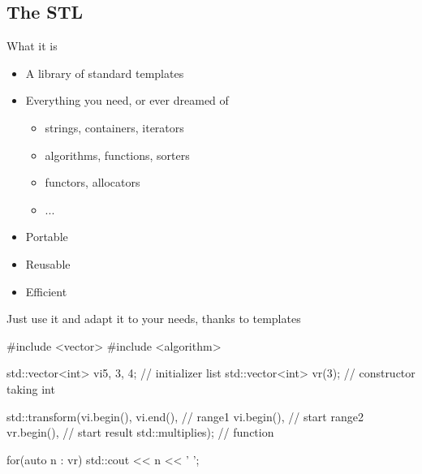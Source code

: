 \subsection[STL]{The STL}

\begin{frame}[fragile]
  \begin{block}{What it is}
    \begin{itemize}
    \item A library of standard templates
    \item Everything you need, or ever dreamed of
      \begin{itemize}
      \item strings, containers, iterators
      \item algorithms, functions, sorters
      \item functors, allocators
      \item ...
      \end{itemize}
    \item Portable
    \item Reusable
    \item Efficient
    \end{itemize}
  \end{block}
  \pause
  \begin{alertblock}{Just use it}
    and adapt it to your needs, thanks to templates
  \end{alertblock}
\end{frame}

\begin{frame}[fragile,label=STLcode]
  \begin{cppcode*}{}
    #include <vector>
    #include <algorithm>

    std::vector<int> vi{5, 3, 4}; // initializer list
    std::vector<int> vr(3); // constructor taking int

    std::transform(vi.begin(), vi.end(),      // range1
                   vi.begin(),          // start range2
                   vr.begin(),          // start result
                   std::multiplies{}); // function

    for(auto n : vr) {
      std::cout << n << ' ';
    }
  \end{cppcode*}
\end{frame}

